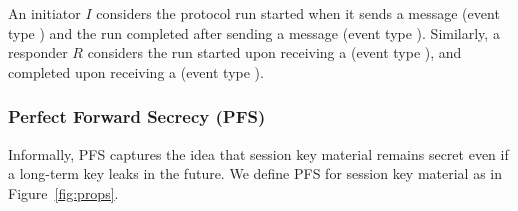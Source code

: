 An initiator $I$ considers the
protocol run started when it sends a message \mMsgone{} (event type \mIStart)
and the run completed after sending a message \mMsgthree{} (event type
\mIComplete).
%
Similarly, a responder $R$ considers the run started upon receiving
a \mMsgone{} (event type \mRStart), and completed upon receiving a \mMsgthree{}
(event type \mRComplete).
%

\subsubsection{Perfect Forward Secrecy (PFS)}
\label{sec:secrecy}
Informally, PFS captures the idea that session key material remains secret
even if a long-term key leaks in the future.
%
We define PFS for session key material \mSessKey{} as \mPredPfs{} in
Figure~\ref{fig:props}.
%

